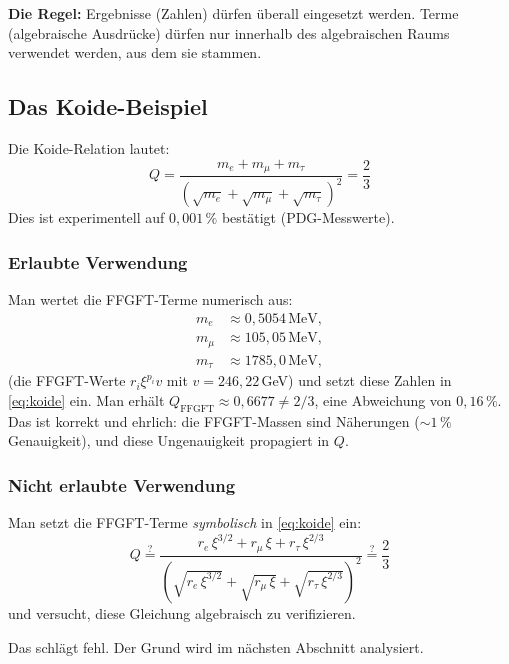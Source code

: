 \textbf{Die Regel:} Ergebnisse (Zahlen) dürfen überall eingesetzt werden.
Terme (algebraische Ausdrücke) dürfen nur innerhalb des algebraischen Raums
verwendet werden, aus dem sie stammen.

\subsection{Das Koide-Beispiel}

Die Koide-Relation lautet:
\begin{equation}
  Q = \frac{m_e + m_\mu + m_\tau}{(\sqrt{m_e}+\sqrt{m_\mu}+\sqrt{m_\tau})^2}
  = \frac{2}{3}
  \label{eq:koide}
\end{equation}
Dies ist experimentell auf $0{,}001\,\%$ bestätigt (PDG-Messwerte).

\subsubsection*{Erlaubte Verwendung}

Man wertet die FFGFT-Terme numerisch aus:
\begin{align*}
  m_e &\approx 0{,}5054\,\text{MeV}, \\
  m_\mu &\approx 105{,}05\,\text{MeV}, \\
  m_\tau &\approx 1785{,}0\,\text{MeV},
\end{align*}
(die FFGFT-Werte $r_i\xi^{p_i}v$ mit $v = 246{,}22$\,GeV)
und setzt diese Zahlen in \eqref{eq:koide} ein. Man erhält
$Q_{\text{FFGFT}} \approx 0{,}6677 \neq 2/3$, eine Abweichung von $0{,}16\,\%$.
Das ist korrekt und ehrlich: die FFGFT-Massen sind Näherungen
($\sim 1\,\%$ Genauigkeit), und diese Ungenauigkeit propagiert in $Q$.

\subsubsection*{Nicht erlaubte Verwendung}

Man setzt die FFGFT-Terme \emph{symbolisch} in \eqref{eq:koide} ein:
\begin{equation}
  Q \stackrel{?}{=}
  \frac{r_e\,\xi^{3/2} + r_\mu\,\xi + r_\tau\,\xi^{2/3}}
  {(\sqrt{r_e\,\xi^{3/2}}+\sqrt{r_\mu\,\xi}+\sqrt{r_\tau\,\xi^{2/3}})^2}
  \stackrel{?}{=} \frac{2}{3}
  \label{eq:falsch}
\end{equation}
und versucht, diese Gleichung algebraisch zu verifizieren.

Das schlägt fehl. Der Grund wird im nächsten Abschnitt analysiert.

